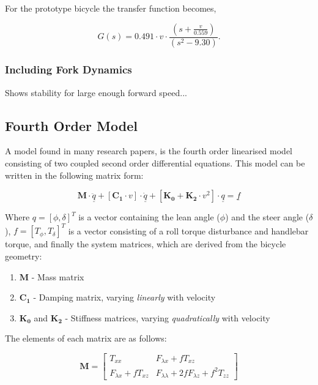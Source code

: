 \documentclass[a4paper]{article}
\begin{document}
For the prototype bicycle the transfer function becomes,

\begin{equation}
G(s) = 0.491 \cdot v \cdot \frac{(s + \frac{v}{0.559})}{(s^2-9.30)}.
\end{equation}

\subsubsection{Including Fork Dynamics}

Shows stability for large enough forward speed...

\subsection{Fourth Order Model}

A model found in many research papers, is the fourth order linearised model consisting of two coupled second order differential equations. This model can be written in the following matrix form:

\begin{equation}
\mathbf{M} \cdot \underline{\ddot{q}} + [\mathbf{C_1} \cdot v] \cdot \underline{\dot{q}} + [\mathbf{K_0} + \mathbf{K_2} \cdot v^2] \cdot \underline{q} = \underline{f}
\end{equation}

Where $q = [\phi,  \delta]^T$ is a vector containing the lean angle ($\phi$) and the steer angle ($\delta$), $f = [T_{\phi}, T_{\delta}]^T$ is a vector consisting of a roll torque disturbance and handlebar torque, and finally the system matrices, which are derived from the bicycle geometry:

\begin{enumerate}
\item $\mathbf{M}$ - Mass matrix
\item $\mathbf{C_1}$ - Damping matrix, varying \textit{linearly} with velocity
\item $\mathbf{K_0}$ and $\mathbf{K_2}$ - Stiffness matrices, varying \textit{quadratically} with velocity
\end{enumerate}

The elements of each matrix are as follows:

\begin{equation}
\mathbf{M} = \begin{bmatrix}
T_{xx} & F_{\lambda x} + f T_{xz} \\
F_{\lambda x} + f T_{xz} & F_{\lambda \lambda} + 2 f F_{\lambda z} + f^2 T_{zz}
\end{bmatrix}
\end{equation}
\end{document}
